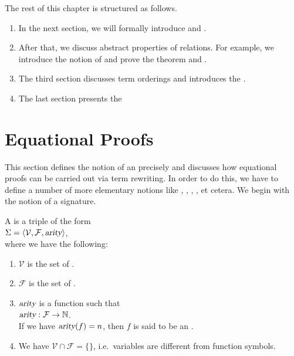 The rest of this chapter is structured as follows.
\begin{enumerate}
\item In the next section, we will formally introduce  and .
\item After that, we discuss abstract properties of relations.  For example, we introduce the notion of 
       and prove the  theorem and .
\item The third section discusses term orderings and introduces the .
\item The last section presents the       
\end{enumerate}

\section{Equational Proofs}
This section defines the notion of an  precisely and discusses how equational proofs can
be carried out via term rewriting.  In order to do this, we have to define a number of more elementary notions
like , , , , et cetera.  We begin with
the notion of a signature.

\begin{Definition}[Signature]
  A   is a triple of the form
  \\[0.2cm]
  \hspace*{1.3cm} $\Sigma = \langle \mathcal{V}, \mathcal{F}, \textsl{arity} \rangle$,
  \\[0.2cm]
  where we have the following: 
  \begin{enumerate}
  \item $\mathcal{V}$ is the set of . 
  \item $\mathcal{F}$ is the set of . 
  \item $\textsl{arity}$ is a function such that
        \\[0.2cm]
        \hspace*{1.3cm}
        $\textsl{arity}: \mathcal{F} \rightarrow \mathbb{N}$.
        \\[0.2cm]
        If we have $\textsl{arity}(f) = n$, then $f$ is said to be an .
  \item We have $\mathcal{V} \cap \mathcal{F} = \{\}$, i.e.~variables are different from function symbols. \eoxs
  \end{enumerate}
\end{Definition}
\pagebreak

